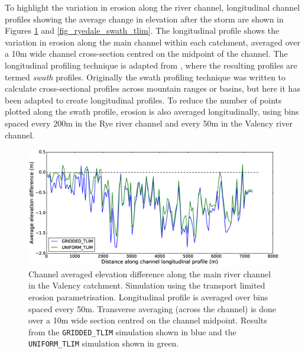 To highlight the variation in erosion along the river channel, longitudinal channel profiles showing the average change in elevation after the storm are shown in Figures \ref{fig_boscastle_swath_tlim} and \ref{fig_ryedale_swath_tlim}. The longitudinal profile shows the variation in erosion along the main channel within each catchment, averaged over a 10m wide channel cross-section centred on the midpoint of the channel. The longitudinal profiling technique is adapted from \citep{hergarten2014extracting}, where the resulting profiles are termed \textit{swath} profiles. Originally the swath profiling technique was written to calculate cross-sectional profiles across mountain ranges or basins, but here it has been adapted to create longitudinal profiles. To reduce the number of points plotted along the swath profile, erosion is also averaged longitudinally, using bins spaced every 200m in the Rye river channel and every 50m in the Valency river channel.

\begin{figure}[htb]
\includegraphics[width=14cm]{chp06_figures_scripts/fig_swath_profile_boscastle_erode_tlim.eps}
\caption{Channel averaged elevation difference along the main river channel in the Valency catchment. Simulation using the transport limited erosion parametrisation. Longitudinal profile is averaged over bins spaced every 50m. Transverse averaging (across the channel) is done over a 10m wide section centred on the channel midpoint. Results from the \texttt{GRIDDED\_TLIM} simulation shown in blue and the \texttt{UNIFORM\_TLIM} simulation shown in green.}
\label{fig_boscastle_swath_tlim}
\end{figure}

